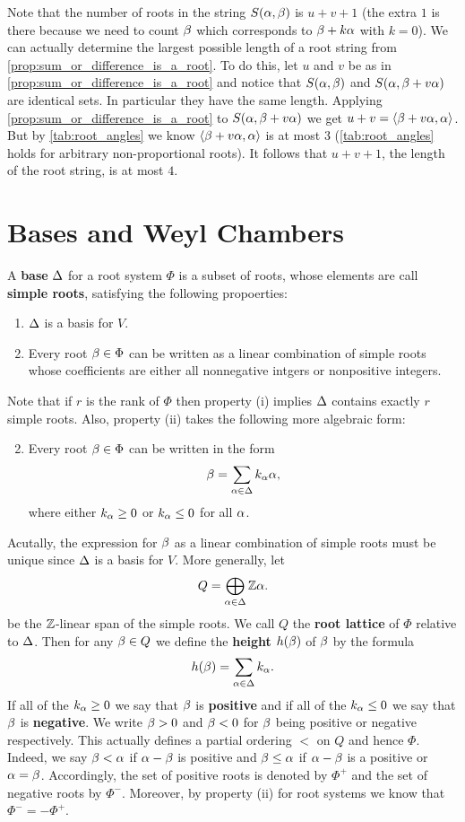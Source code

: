 \documentclass[12pt,reqno,oneside]{amsart}
\begin{document}
     Note that the number of roots in the string $S(\alpha,\beta)$ is $u+v+1$ (the extra $1$ is there because we need to count $\beta$ which corresponds to $\beta+k\alpha$ with $k = 0$). We can actually determine the largest possible length of a root string from \cref{prop:sum_or_difference_is_a_root}. To do this, let $u$ and $v$ be as in \cref{prop:sum_or_difference_is_a_root} and notice that $S(\alpha,\beta)$ and $S(\alpha,\beta+v\alpha)$ are identical sets. In particular they have the same length. Applying \cref{prop:sum_or_difference_is_a_root} to $S(\alpha,\beta+v\alpha)$ we get $u+v = \langle\beta+v\alpha,\alpha\rangle$. But by \cref{tab:root_angles} we know $\langle\beta+v\alpha,\alpha\rangle$ is at most $3$ (\cref{tab:root_angles} holds for arbitrary non-proportional roots). It follows that $u+v+1$, the length of the root string, is at most $4$.
\section{Bases and Weyl Chambers}
    A \textbf{base} $\Delta$ for a root system $\Phi$ is a subset of roots, whose elements are call \textbf{simple roots}, satisfying the following propoerties:

    \begin{enumerate}[label=(\roman*)]
        \item $\Delta$ is a basis for $V$.
        \item Every root $\beta \in \Phi$ can be written as a linear combination of simple roots whose coefficients are either all nonnegative intgers or nonpositive integers.
    \end{enumerate}

    Note that if $r$ is the rank of $\Phi$ then property (i) implies $\Delta$ contains exactly $r$ simple roots. Also, property (ii) takes the following more algebraic form:

    \begin{enumerate}[label=(\roman*)]
        \setcounter{enumi}{1}
        \item Every root $\beta \in \Phi$ can be written in the form
        \[
            \beta = \sum_{\alpha \in \Delta}k_{\alpha}\alpha,
        \]
        where either $k_{\alpha} \ge 0$ or $k_{\alpha} \le 0$ for all $\alpha$.
    \end{enumerate}

    Acutally, the expression for $\beta$ as a linear combination of simple roots must be unique since $\Delta$ is a basis for $V$. More generally, let
    \[
        Q = \bigoplus_{\alpha \in \Delta}\mathbb{Z}\alpha.
    \]
    be the $\mathbb{Z}$-linear span of the simple roots. We call $Q$ the \textbf{root lattice} of $\Phi$ relative to $\Delta$. Then for any $\beta \in Q$ we define the \textbf{height} $h(\beta)$ of $\beta$ by the formula
    \[
        h(\beta) = \sum_{\alpha \in \Delta}k_{\alpha}.
    \]
    If all of the $k_{\alpha} \ge 0$ we say that $\beta$ is \textbf{positive} and if all of the $k_{\alpha} \le 0$ we say that $\beta$ is \textbf{negative}. We write $\beta > 0$ and $\beta < 0$ for $\beta$ being positive or negative respectively. This actually defines a partial ordering $<$ on $Q$ and hence $\Phi$. Indeed, we say $\beta < \alpha$ if $\alpha-\beta$ is positive and $\beta \le \alpha$ if $\alpha-\beta$ is a positive or $\alpha = \beta$. Accordingly, the set of positive roots is denoted by $\Phi^{+}$ and the set of negative roots by $\Phi^{-}$. Moreover, by property (ii) for root systems we know that $\Phi^{-} = -\Phi^{+}$.
\end{document}
